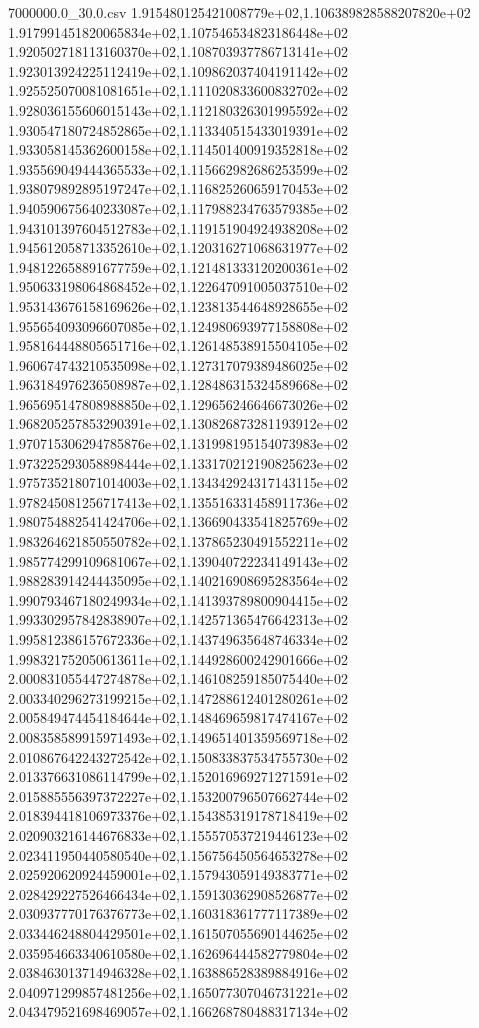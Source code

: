 \begin{filecontents*}{7000000.0_30.0.csv}
1.915480125421008779e+02,1.106389828588207820e+02
1.917991451820065834e+02,1.107546534823186448e+02
1.920502718113160370e+02,1.108703937786713141e+02
1.923013924225112419e+02,1.109862037404191142e+02
1.925525070081081651e+02,1.111020833600832702e+02
1.928036155606015143e+02,1.112180326301995592e+02
1.930547180724852865e+02,1.113340515433019391e+02
1.933058145362600158e+02,1.114501400919352818e+02
1.935569049444365533e+02,1.115662982686253599e+02
1.938079892895197247e+02,1.116825260659170453e+02
1.940590675640233087e+02,1.117988234763579385e+02
1.943101397604512783e+02,1.119151904924938208e+02
1.945612058713352610e+02,1.120316271068631977e+02
1.948122658891677759e+02,1.121481333120200361e+02
1.950633198064868452e+02,1.122647091005037510e+02
1.953143676158169626e+02,1.123813544648928655e+02
1.955654093096607085e+02,1.124980693977158808e+02
1.958164448805651716e+02,1.126148538915504105e+02
1.960674743210535098e+02,1.127317079389486025e+02
1.963184976236508987e+02,1.128486315324589668e+02
1.965695147808988850e+02,1.129656246646673026e+02
1.968205257853290391e+02,1.130826873281193912e+02
1.970715306294785876e+02,1.131998195154073983e+02
1.973225293058898444e+02,1.133170212190825623e+02
1.975735218071014003e+02,1.134342924317143115e+02
1.978245081256717413e+02,1.135516331458911736e+02
1.980754882541424706e+02,1.136690433541825769e+02
1.983264621850550782e+02,1.137865230491552211e+02
1.985774299109681067e+02,1.139040722234149143e+02
1.988283914244435095e+02,1.140216908695283564e+02
1.990793467180249934e+02,1.141393789800904415e+02
1.993302957842838907e+02,1.142571365476642313e+02
1.995812386157672336e+02,1.143749635648746334e+02
1.998321752050613611e+02,1.144928600242901666e+02
2.000831055447274878e+02,1.146108259185075440e+02
2.003340296273199215e+02,1.147288612401280261e+02
2.005849474454184644e+02,1.148469659817474167e+02
2.008358589915971493e+02,1.149651401359569718e+02
2.010867642243272542e+02,1.150833837534755730e+02
2.013376631086114799e+02,1.152016969271271591e+02
2.015885556397372227e+02,1.153200796507662744e+02
2.018394418106973376e+02,1.154385319178718419e+02
2.020903216144676833e+02,1.155570537219446123e+02
2.023411950440580540e+02,1.156756450564653278e+02
2.025920620924459001e+02,1.157943059149383771e+02
2.028429227526466434e+02,1.159130362908526877e+02
2.030937770176376773e+02,1.160318361777117389e+02
2.033446248804429501e+02,1.161507055690144625e+02
2.035954663340610580e+02,1.162696444582779804e+02
2.038463013714946328e+02,1.163886528389884916e+02
2.040971299857481256e+02,1.165077307046731221e+02
2.043479521698469057e+02,1.166268780488317134e+02

\end{filecontents*}

